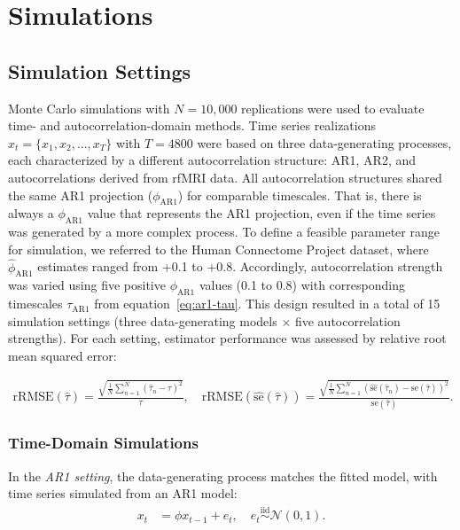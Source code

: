 \documentclass[docs/main.tex]{subfiles}
\begin{document}
\section{Simulations}\label{sec:simulations}

\subsection{Simulation Settings}
Monte Carlo simulations with $N = 10,000$ replications were used to evaluate time- and autocorrelation-domain methods. Time series realizations $x_t = \{x_1, x_2, ..., x_T\}$ with $T=4800$ were based on three data-generating processes, each characterized by a different autocorrelation structure: AR1, AR2, and autocorrelations derived from rfMRI data. All autocorrelation structures shared the same AR1 projection ($\phi_\text{AR1}$) for comparable timescales. That is, there is always a $\phi_\text{AR1}$ value that represents the AR1 projection, even if the time series was generated by a more complex process. To define a feasible parameter range for simulation, we referred to the Human Connectome Project dataset, where $\hat\phi_\text{AR1}$ estimates ranged from +0.1 to +0.8. Accordingly, autocorrelation strength was varied using five positive $\phi_\text{AR1}$ values (0.1 to 0.8) with corresponding timescales $\tau_\text{AR1}$ from equation~\eqref{eq:ar1-tau}. This design resulted in a total of 15 simulation settings (three data-generating models $\times$ five autocorrelation strengths). For each setting, estimator performance was assessed by relative root mean squared error:

\begin{align}
    \text{rRMSE}(\hat\tau) = \frac{\sqrt{\frac{1}{N} \sum_{n=1}^N (\hat\tau_n - \tau)^2}}{\tau}, \quad \text{rRMSE}(\widehat{\text{se}}(\hat\tau)) = \frac{\sqrt{\frac{1}{N} \sum_{n=1}^N \left(\widehat{\text{se}}(\hat\tau_n) - \text{se}(\hat\tau)\right)^2}}{\text{se}(\hat\tau)}.
\end{align}

\subsubsection{Time-Domain Simulations}
In the \textit{AR1 setting}, the data-generating process matches the fitted model, with time series simulated from an AR1 model:
\begin{align}
    x_t &= \phi x_{t-1} + e_t, \quad e_t \overset{\text{iid}}{\sim} \mathcal{N}(0, 1).
\end{align}
\end{document}
